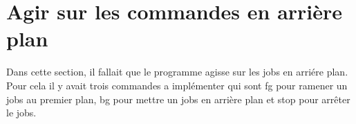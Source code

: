 \documentclass{report}
\begin{document}
		\section{Agir sur les commandes en arri\`ere plan}
			Dans cette section, il fallait que le programme agisse sur les jobs en arri\'ere plan. Pour cela il y avait trois commandes a impl\'ementer qui sont fg pour ramener un jobs au premier plan, bg pour mettre un jobs en arri\`ere plan et stop pour arr\^eter le jobs.\\
			\begin{lstlisting}
			\end{lstlisting}
			\begin{lstlisting}[frame=single,basicstyle=\footnotesize,language=bash]
			\end{lstlisting}
			\begin{lstlisting}[frame=single,basicstyle=\footnotesize,language=bash]
			\end{lstlisting}
\end{document}

